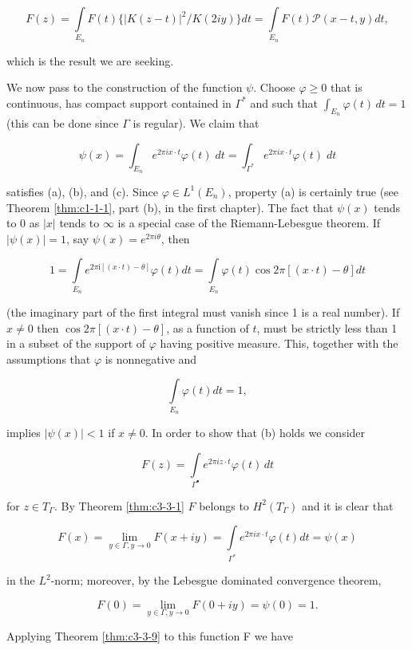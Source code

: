 \[
F(z)=\int\limits_{E_{n}}F(t)\{|K(z-t)|^{2}/K(2i y)\}d t=\int\limits_{E_{n}}F(t)\mathcal{P}(x-t,y)d t,
\]

which is the result we are seeking.

We now pass to the construction of the function $\psi$. Choose $\varphi \geq 0$ that is continuous, has compact support contained in $\Gamma^*$ and such that $\int_{E_n} \varphi(t) \, dt = 1$ (this can be done since $\Gamma$ is regular). We claim that

\[
\psi(x)=\int_{E_{n}}e^{2\pi i x\cdot t}\varphi(t)\;d t=\int_{\Gamma^{*}}e^{2\pi i x\cdot t}\varphi(t)\;d t
\]

satisfies (a), (b), and (c). Since $\varphi \in L^{1}(E_{n})$, property (a) is certainly true (see Theorem \ref{thm:c1-1-1}, part (b), in the first chapter). The fact that $\psi(x)$ tends to 0 as $|x|$ tends to $\infty$ is a special case of the Riemann-Lebesgue theorem. If $|\psi(x)| = 1$, say $\psi(x) = e^{2\pi i\theta}$, then

\[
1=\int\limits_{E_{n}}e^{2\pi\mathrm{i}\left[(x\cdot t)-\theta\right]}\varphi(t)dt=\int\limits_{E_{n}}\varphi(t)\cos2\pi\left[(x\cdot t)-\theta\right]dt
\]

(the imaginary part of the first integral must vanish since 1 is a real number). If $x \neq 0$ then $\cos 2\pi[(x \cdot t) - \theta]$, as a function of $t$, must be strictly less than 1 in a subset of the support of $\varphi$ having positive measure. This, together with the assumptions that $\varphi$ is nonnegative and

\[
\int\limits_{E_{n}}\varphi(t)dt=1,
\]

implies $\left|\psi(x)\right| < 1$ if $x \neq 0$. In order to show that (b) holds we consider

\[
F(z)=\int\limits_{\Gamma^{\bullet}}e^{2\pi i z\cdot t}\varphi(t)\,dt
\]

for $z \in T_{\Gamma}$. By Theorem \ref{thm:c3-3-1} $F$ belongs to $H^2(T_{\Gamma})$ and it is clear that

\[
F(x)=\lim_{y\in\Gamma,y\to0}F(x+iy)=\int\limits_{\Gamma^{*}}e^{2\pi i x\cdot t}\varphi(t)dt=\psi(x)
\]

in the $L^{2}$-norm; moreover, by the Lebesgue dominated convergence theorem,

\begin{equation}\label{eq:c3-3-11}
F(0)=\lim_{y\in\Gamma,y\to0}F(0+iy)=\psi(0)=1.
\end{equation}

Applying Theorem \ref{thm:c3-3-9} to this function F we have


